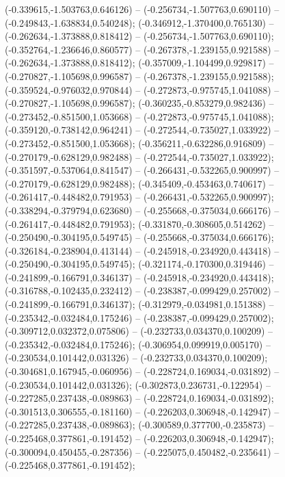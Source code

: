  (-0.339615,-1.503763,0.646126) -- (-0.256734,-1.507763,0.690110) -- (-0.249843,-1.638834,0.540248);
 (-0.346912,-1.370400,0.765130) -- (-0.262634,-1.373888,0.818412) -- (-0.256734,-1.507763,0.690110);
 (-0.352764,-1.236646,0.860577) -- (-0.267378,-1.239155,0.921588) -- (-0.262634,-1.373888,0.818412);
 (-0.357009,-1.104499,0.929817) -- (-0.270827,-1.105698,0.996587) -- (-0.267378,-1.239155,0.921588);
 (-0.359524,-0.976032,0.970844) -- (-0.272873,-0.975745,1.041088) -- (-0.270827,-1.105698,0.996587);
 (-0.360235,-0.853279,0.982436) -- (-0.273452,-0.851500,1.053668) -- (-0.272873,-0.975745,1.041088);
 (-0.359120,-0.738142,0.964241) -- (-0.272544,-0.735027,1.033922) -- (-0.273452,-0.851500,1.053668);
 (-0.356211,-0.632286,0.916809) -- (-0.270179,-0.628129,0.982488) -- (-0.272544,-0.735027,1.033922);
 (-0.351597,-0.537064,0.841547) -- (-0.266431,-0.532265,0.900997) -- (-0.270179,-0.628129,0.982488);
 (-0.345409,-0.453463,0.740617) -- (-0.261417,-0.448482,0.791953) -- (-0.266431,-0.532265,0.900997);
 (-0.338294,-0.379794,0.623680) -- (-0.255668,-0.375034,0.666176) -- (-0.261417,-0.448482,0.791953);
 (-0.331870,-0.308605,0.514262) -- (-0.250490,-0.304195,0.549745) -- (-0.255668,-0.375034,0.666176);
 (-0.326184,-0.238904,0.413144) -- (-0.245918,-0.234920,0.443418) -- (-0.250490,-0.304195,0.549745);
 (-0.321174,-0.170300,0.319446) -- (-0.241899,-0.166791,0.346137) -- (-0.245918,-0.234920,0.443418);
 (-0.316788,-0.102435,0.232412) -- (-0.238387,-0.099429,0.257002) -- (-0.241899,-0.166791,0.346137);
 (-0.312979,-0.034981,0.151388) -- (-0.235342,-0.032484,0.175246) -- (-0.238387,-0.099429,0.257002);
 (-0.309712,0.032372,0.075806) -- (-0.232733,0.034370,0.100209) -- (-0.235342,-0.032484,0.175246);
 (-0.306954,0.099919,0.005170) -- (-0.230534,0.101442,0.031326) -- (-0.232733,0.034370,0.100209);
 (-0.304681,0.167945,-0.060956) -- (-0.228724,0.169034,-0.031892) -- (-0.230534,0.101442,0.031326);
 (-0.302873,0.236731,-0.122954) -- (-0.227285,0.237438,-0.089863) -- (-0.228724,0.169034,-0.031892);
 (-0.301513,0.306555,-0.181160) -- (-0.226203,0.306948,-0.142947) -- (-0.227285,0.237438,-0.089863);
 (-0.300589,0.377700,-0.235873) -- (-0.225468,0.377861,-0.191452) -- (-0.226203,0.306948,-0.142947);
 (-0.300094,0.450455,-0.287356) -- (-0.225075,0.450482,-0.235641) -- (-0.225468,0.377861,-0.191452);
